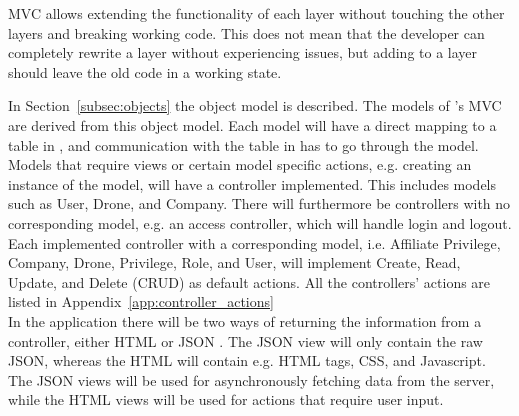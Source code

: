 
MVC allows extending the functionality of each layer without touching the other layers and breaking working code.
This does not mean that the developer can completely rewrite a layer without experiencing issues, but adding to a layer should leave the old code in a working state.

In Section~\ref{subsec:objects} the object model is described.
The models of 's MVC are derived from this object model.
Each model will have a direct mapping to a table in , and communication with the table in  has to go through the model. \\

Models that require views or certain model specific actions, e.g. creating an instance of the model, will have a controller implemented.
This includes models such as User, Drone, and Company.
There will furthermore be controllers with no corresponding model, e.g. an access controller, which will handle login and logout.
Each implemented controller with a corresponding model, i.e. Affiliate Privilege, Company, Drone, Privilege, Role, and User, will implement Create, Read, Update, and Delete (CRUD) as default actions. All the controllers' actions are listed in Appendix~\ref{app:controller_actions} \\

In the application there will be two ways of returning the information from a controller, either HTML \citep{what_is_html} or JSON \citep{what_is_json}.
The JSON view will only contain the raw JSON, whereas the HTML will contain e.g. HTML tags, CSS, and Javascript.
The JSON views will be used for asynchronously fetching data from the server, while the HTML views will be used for actions that require user input. \\

